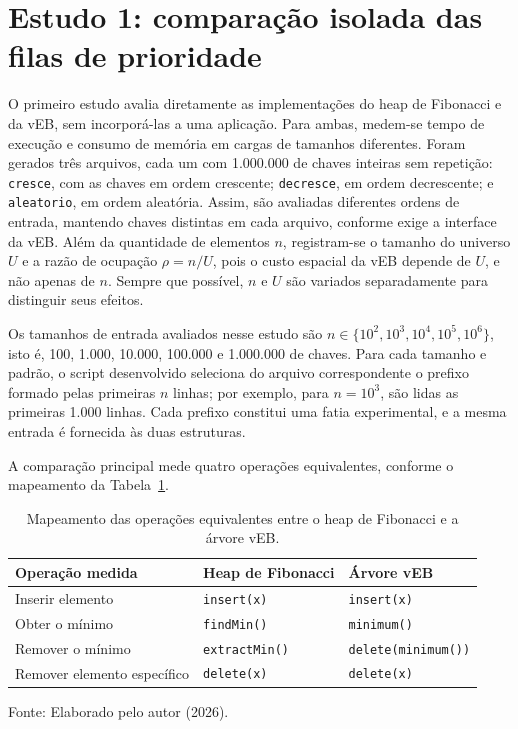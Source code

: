 \documentclass[12pt,a4paper]{report}
\begin{document}
\section{Estudo 1: comparação isolada das filas de prioridade}

O primeiro estudo avalia diretamente as implementações do heap de Fibonacci e da vEB, sem incorporá-las a uma aplicação. Para ambas, medem-se tempo de execução e consumo de memória em cargas de tamanhos diferentes. Foram gerados três arquivos, cada um com 1.000.000 de chaves inteiras sem repetição: \texttt{cresce}, com as chaves em ordem crescente; \texttt{decresce}, em ordem decrescente; e \texttt{aleatorio}, em ordem aleatória. Assim, são avaliadas diferentes ordens de entrada, mantendo chaves distintas em cada arquivo, conforme exige a interface da vEB. Além da quantidade de elementos \(n\), registram-se o tamanho do universo \(U\) e a razão de ocupação \(\rho=n/U\), pois o custo espacial da vEB depende de \(U\), e não apenas de \(n\). Sempre que possível, \(n\) e \(U\) são variados separadamente para distinguir seus efeitos.

Os tamanhos de entrada avaliados nesse estudo são \(n\in\{10^2,\allowbreak 10^3,\allowbreak 10^4,\allowbreak 10^5,\allowbreak 10^6\}\), isto é, 100, 1.000, 10.000, 100.000 e 1.000.000 de chaves. Para cada tamanho e padrão, o script desenvolvido seleciona do arquivo correspondente o prefixo formado pelas primeiras \(n\) linhas; por exemplo, para \(n=10^3\), são lidas as primeiras 1.000 linhas. Cada prefixo constitui uma fatia experimental, e a mesma entrada é fornecida às duas estruturas.

A comparação principal mede quatro operações equivalentes, conforme o mapeamento da Tabela~\ref{tab:operacoes-equivalentes}.

\begin{table}[htbp]
  \centering
  \caption{Mapeamento das operações equivalentes entre o heap de Fibonacci e a árvore vEB.}
  \label{tab:operacoes-equivalentes}
  \begin{tabular}{lll}
    \toprule
    \textbf{Operação medida} & \textbf{Heap de Fibonacci} & \textbf{Árvore vEB} \\
    \midrule
    Inserir elemento & \texttt{insert(x)} & \texttt{insert(x)} \\
    Obter o mínimo & \texttt{findMin()} & \texttt{minimum()} \\
    Remover o mínimo & \texttt{extractMin()} & \texttt{delete(minimum())} \\
    Remover elemento específico & \texttt{delete(x)} & \texttt{delete(x)} \\
    \bottomrule
  \end{tabular}
  \vspace{0.2cm}
  
  \raggedright\footnotesize Fonte: Elaborado pelo autor (2026).
\end{table}
\end{document}
